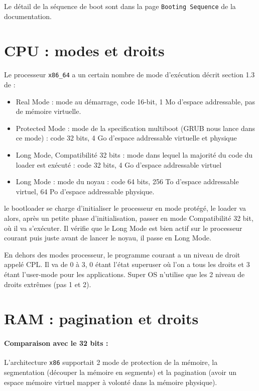 \documentclass[12pt]{report}
\begin{document}
Le détail de la séquence de boot sont dans la page \verb$Booting Sequence$ de la
documentation.

\section{CPU : modes et droits}

Le processeur \verb$x86_64$ a un certain nombre de mode d'exécution décrit
section 1.3 de \cite{specAMD} :
\begin{itemize}
\item Real Mode : mode au démarrage, code 16-bit, 1 Mo d'espace addressable, pas
  de mémoire virtuelle.
\item Protected Mode : mode de la specification multiboot (GRUB nous lance dans
  ce mode) : code 32 bits, 4 Go d'espace addressable virtuelle et physique
\item Long Mode, Compatibilité 32 bits : mode dans lequel la majorité du code du
  loader est exécuté : code 32 bits, 4 Go d'espace addressable virtuel
\item Long Mode : mode du noyau : code 64 bits, 256 To d'espace addressable
  virtuel, 64 Po d'espace addressable physique. 
\end{itemize}

le bootloader se charge d'initialiser le processeur en mode protégé, le loader
va alors, après un petite phase d'initialisation, passer en mode Compatibilité
32 bit, où il va s'exécuter. Il vérifie que le Long Mode est bien actif sur le
processeur courant puis juste avant de lancer le noyau, il passe en
Long Mode. 

En dehors des modes processeur, le programme courant a un niveau de droit
appelé CPL. Il va de 0 à 3, 0 étant l'état superuser où l'on a tous les droits
et 3 étant l'user-mode pour les applications. Super OS n'utilise que les 2
niveau de droits extrêmes (pas 1 et 2).

\section{RAM : pagination et droits}

\paragraph{Comparaison avec le 32 bits :} L'architecture \verb$x86$ supportait 2
mode de protection de la mémoire, la segmentation (découper la mémoire en
segments) et la pagination (avoir un espace mémoire virtuel mapper à volonté
dans la mémoire physique).
\end{document}
